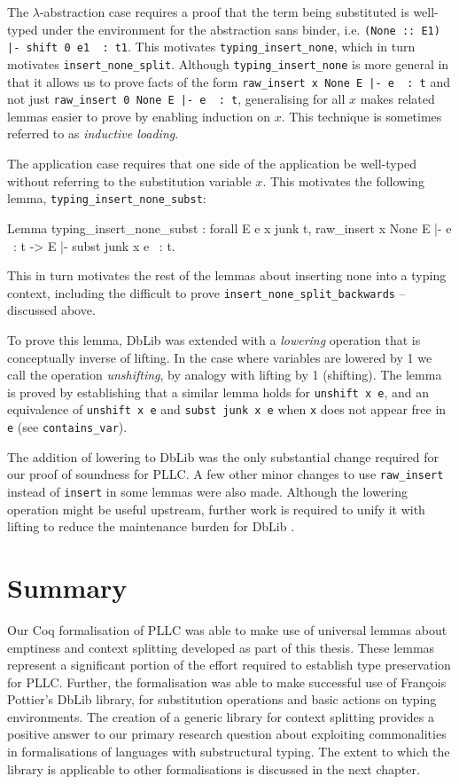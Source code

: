 \documentclass[]{unswthesis}
\newcommand{\Francois}{Fran\frenchc{c}ois }
\let\frenchc\c
\let\c\texttt
\let\i\textit
\begin{document}
The $\lambda$-abstraction case requires a proof that the term being substituted is well-typed under the environment for the abstraction sans binder, i.e. \c{(None :: E1) |- shift 0 e1 ~: t1}. This motivates \c{typing_insert_none}, which in turn motivates \c{insert_none_split}. Although \c{typing_insert_none} is more general in that it allows us to prove facts of the form \c{raw_insert x None E |- e ~: t} and not just \c{raw_insert 0 None E |- e ~: t}, generalising for all $x$ makes related lemmas easier to prove by enabling induction on $x$. This technique is sometimes referred to as \i{inductive loading}.

The application case requires that one side of the application be well-typed without referring to the substitution variable $x$. This motivates the following lemma, \c{typing_insert_none_subst}:

\begin{coqcode}
Lemma typing_insert_none_subst : forall E e x junk t,
  raw_insert x None E |- e ~: t ->
  E |- subst junk x e ~: t.
\end{coqcode}

This in turn motivates the rest of the lemmas about inserting none into a typing context, including the difficult to prove \c{insert_none_split_backwards} -- discussed above.

To prove this lemma, DbLib was extended with a \i{lowering} operation that is conceptually inverse of lifting. In the case where variables are lowered by 1 we call the operation \i{unshifting}, by analogy with lifting by 1 (shifting). The lemma is proved by establishing that a similar lemma holds for \c{unshift x e}, and an equivalence of \c{unshift x e} and \c{subst junk x e} when \c{x} does not appear free in \c{e} (see \c{contains_var}).

The addition of lowering to DbLib was the only substantial change required for our proof of soundness for PLLC. A few other minor changes to use \c{raw_insert} instead of \c{insert} in some lemmas were also made. Although the lowering operation might be useful upstream, further work is required to unify it with lifting to reduce the maintenance burden for DbLib \cite{dblibPullRequest}.

\section{Summary}

Our Coq formalisation of PLLC was able to make use of universal lemmas about emptiness and context splitting developed as part of this thesis. These lemmas represent a significant portion of the effort required to establish type preservation for PLLC. Further, the formalisation was able to make successful use of \Francois Pottier's DbLib library, for substitution operations and basic actions on typing environments. The creation of a generic library for context splitting provides a positive answer to our primary research question about exploiting commonalities in formalisations of languages with substructural typing. The extent to which the library is applicable to other formalisations is discussed in the next chapter.
\end{document}
